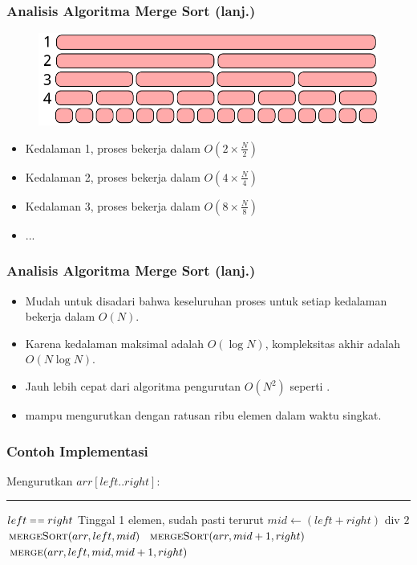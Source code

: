 \begin{frame}
\frametitle{Analisis Algoritma Merge Sort (lanj.)}
\begin{figure}
  \centering
  \includegraphics[width=10 cm]{asset/merge-sort-complexity.pdf}
\end{figure}
\begin{itemize}
  \item Kedalaman 1, proses  bekerja dalam $O(2 \times \frac{N}{2})$
  \item Kedalaman 2, proses  bekerja dalam $O(4 \times \frac{N}{4})$
  \item Kedalaman 3, proses  bekerja dalam $O(8 \times \frac{N}{8})$
  \item ...
\end{itemize}
\end{frame}

\begin{frame}
\frametitle{Analisis Algoritma Merge Sort (lanj.)}
\begin{itemize}
  \item Mudah untuk disadari bahwa keseluruhan proses untuk setiap kedalaman bekerja dalam $O(N)$.
  \item Karena kedalaman maksimal adalah $O(\log{N})$, kompleksitas akhir \fMergeSort adalah $O(N \log{N})$.
  \item Jauh lebih cepat dari algoritma pengurutan $O(N^2)$ seperti .
  \item \fMergeSort mampu mengurutkan \farray dengan ratusan ribu elemen dalam waktu singkat.
\end{itemize}
\end{frame}


\begin{frame}
\frametitle{Contoh Implementasi}
Mengurutkan $arr[left..right]$:
\noindent\rule{10cm}{0.4pt}
\begin{codebox}
\li \If $left \isequal right$ \Then
\li   \Comment Tinggal 1 elemen, sudah pasti terurut
\li \Else
\li   $mid \gets (left + right)$ div $2$
\li   $\textnormal{\scshape mergeSort}(arr, left, mid)$
\li   $\textnormal{\scshape mergeSort}(arr, mid+1, right)$
\li   $\textnormal{\scshape merge}(arr, left, mid, mid+1, right)$
    \End
\end{codebox}
\end{frame}

